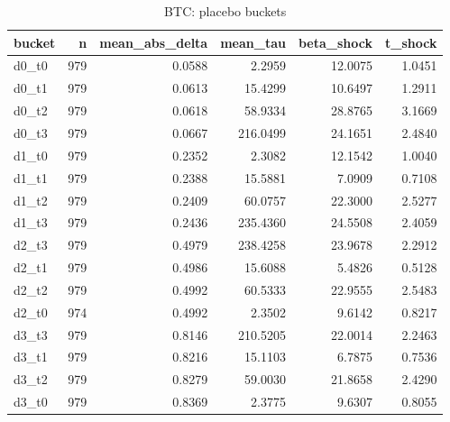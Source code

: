 \begin{table}
\caption{BTC: placebo buckets}
\label{tab:t7_placebo_buckets_BTC}
\begin{tabular}{lrrrrr}
\toprule
bucket & n & mean\_abs\_delta & mean\_tau & beta\_shock & t\_shock \\
\midrule
d0\_t0 & 979 & 0.0588 & 2.2959 & 12.0075 & 1.0451 \\
d0\_t1 & 979 & 0.0613 & 15.4299 & 10.6497 & 1.2911 \\
d0\_t2 & 979 & 0.0618 & 58.9334 & 28.8765 & 3.1669 \\
d0\_t3 & 979 & 0.0667 & 216.0499 & 24.1651 & 2.4840 \\
d1\_t0 & 979 & 0.2352 & 2.3082 & 12.1542 & 1.0040 \\
d1\_t1 & 979 & 0.2388 & 15.5881 & 7.0909 & 0.7108 \\
d1\_t2 & 979 & 0.2409 & 60.0757 & 22.3000 & 2.5277 \\
d1\_t3 & 979 & 0.2436 & 235.4360 & 24.5508 & 2.4059 \\
d2\_t3 & 979 & 0.4979 & 238.4258 & 23.9678 & 2.2912 \\
d2\_t1 & 979 & 0.4986 & 15.6088 & 5.4826 & 0.5128 \\
d2\_t2 & 979 & 0.4992 & 60.5333 & 22.9555 & 2.5483 \\
d2\_t0 & 974 & 0.4992 & 2.3502 & 9.6142 & 0.8217 \\
d3\_t3 & 979 & 0.8146 & 210.5205 & 22.0014 & 2.2463 \\
d3\_t1 & 979 & 0.8216 & 15.1103 & 6.7875 & 0.7536 \\
d3\_t2 & 979 & 0.8279 & 59.0030 & 21.8658 & 2.4290 \\
d3\_t0 & 979 & 0.8369 & 2.3775 & 9.6307 & 0.8055 \\
\bottomrule
\end{tabular}
\end{table}
